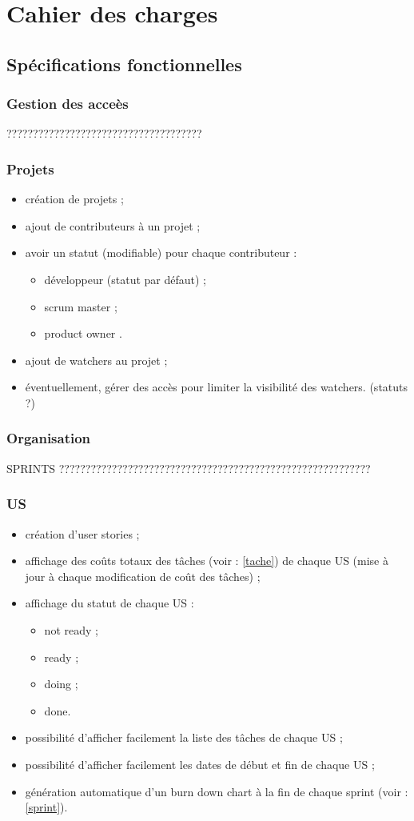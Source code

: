 \chapter{Cahier des charges}
\section{Sp\'ecifications fonctionnelles}
\subsection{Gestion des acce\`es}
?????????????????????????????????????
\subsection{Projets}
\begin{itemize}
\item cr\'eation de projets ;
\item ajout de contributeurs \`a un projet ;
\item avoir un statut (modifiable) pour chaque contributeur :
\begin{itemize}
\item d\'eveloppeur (statut par d\'efaut) ;
\item scrum master ;
\item product owner .
\end{itemize}
\item ajout de \og{}watchers\fg{} au projet ;
\item \'eventuellement, g\'erer des acc\`es pour limiter la visibilit\'e des \og{}watchers\fg{}. (statuts ?)
\end{itemize}
\subsection{Organisation}
SPRINTS ???????????????????????????????????????????????????????????\label{sprint}
\subsection{US}
\begin{itemize}
\item cr\'eation d'user stories ;
\item affichage des co\^uts totaux des t\^aches (voir : \ref{tache}) de chaque US (mise \`a jour \`a chaque modification de co\^ut des t\^aches) ;
\item affichage du  statut de chaque US :
\begin{itemize}
\item not ready ;
\item ready ;
\item doing ;
\item done.
\end{itemize}
\item possibilit\'e d'afficher facilement la liste des t\^aches de chaque US ;
\item possibilit\'e d'afficher facilement les dates de d\'ebut et fin de chaque US ;
\item g\'en\'eration automatique d'un burn down chart \`a la fin de chaque sprint (voir : \ref{sprint}).
\end{itemize}
